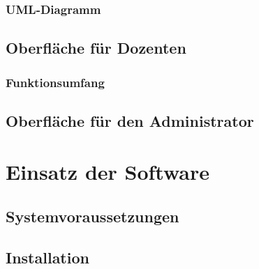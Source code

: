\documentclass[12pt,a4paper,parskip]{scrreprt}
\begin{document}
\subsection{UML-Diagramm}
\section{Oberfläche für Dozenten}
\subsection{Funktionsumfang}
\section{Oberfläche für den Administrator}
\chapter{Einsatz der Software}
\section{Systemvoraussetzungen}
\section{Installation}
\end{document}
